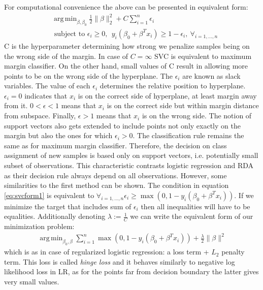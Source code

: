 \documentclass[shortabstract, english, mgr]{iithesis}
\DeclareMathOperator*{\argmin}{arg\,min}
\begin{document}
For computational convenience the above can be presented in equivalent form:
\begin{align}
& \argmin_{\beta, \beta_0} \frac{1}{2}\|\beta\|^2_2 + C \sum_{i=1}^n \epsilon_i \nonumber \\ &{\text { subject to }}\epsilon_i \geq 0, \ \  y_{i}\left(\beta_{0}+\beta^T x_i\right) \geq 1 - \epsilon_i, \ \forall_{i=1, \ldots, n} \label{eq:svcform1}
\end{align}
C is the hyperparameter determining how strong we penalize samples being on the wrong side of the margin. In case of $C = \infty$ SVC is equivalent to maximum margin classifier. On the other hand, small values of C result in allowing more points to be on the wrong side of the hyperplane. The $\epsilon_i$ are known as slack variables. The value of each $\epsilon_i$ determines the relative position to hyperplane. $\epsilon_i=0$ indicates that $x_i$ is on the correct side of hyperplane, at least margin away from it. $0< \epsilon < 1$ means that $x_i$ is on the correct side but within margin distance from subspace. Finally, $\epsilon > 1$ means that $x_i$ is on the wrong side. The notion of support vectors also gets extended to include points not only exactly on the margin but also the ones for which $\epsilon_i > 0$. The classification rule remains the same as for maximum margin classifier. Therefore, the decision on class assignment of new samples is based only on support vectors, i.e. potentially small subset of observations. This characteristic contrasts logistic regression and RDA as their decision rule always depend on all observations. However, some similarities to the first method can be shown. The condition in equation \ref{eq:svcform1} is equivalent to $\forall_{i=1, \ldots, n} \epsilon_i \geq \max \left(0, 1 - y_i(\beta_0 + \beta^Tx_i) \right)$. If we minimize the target that includes sum of $\epsilon_i$ then all inequalities will have to be equalities. Additionally denoting $\lambda := \frac{1}{C}$ we can write the equivalent form of our minimization problem:
\begin{align*}
    \argmin_{\beta_0, \beta} \sum_{i=1}^n \max \left(0, 1 - y_i(\beta_0 + \beta^Tx_i)\right) + \frac{\lambda}{2} \|\beta\|^2
\end{align*}
which is as in case of regularized logistic regression: a loss term + $L_2$ penalty term. This loss is called \textit{hinge loss} and it behaves similarly to negative log likelihood loss in LR, as for the points far from decision boundary the latter gives very small values.
\end{document}
